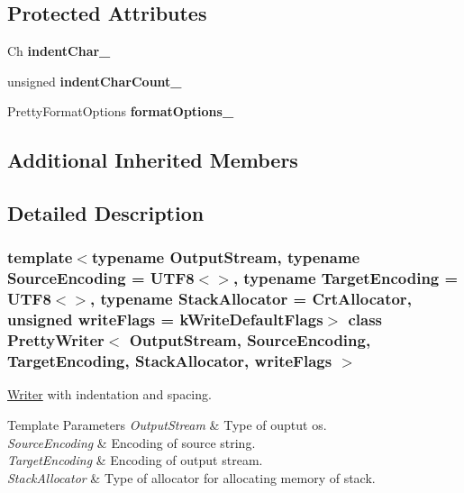 \subsection*{Protected Attributes}
\begin{DoxyCompactItemize}
\item 
\mbox{\label{a02228_aaa3f6380daa8466a5101ed18fc33bf04}} 
Ch {\bfseries indent\+Char\+\_\+}
\item 
\mbox{\label{a02228_a7d00b9716ef3cd7e34ae1b744c968f13}} 
unsigned {\bfseries indent\+Char\+Count\+\_\+}
\item 
\mbox{\label{a02228_a15505ed4ea0fa85d339b3a987f1a3aaf}} 
Pretty\+Format\+Options {\bfseries format\+Options\+\_\+}
\end{DoxyCompactItemize}
\subsection*{Additional Inherited Members}


\subsection{Detailed Description}
\subsubsection*{template$<$typename Output\+Stream, typename Source\+Encoding = U\+T\+F8$<$$>$, typename Target\+Encoding = U\+T\+F8$<$$>$, typename Stack\+Allocator = Crt\+Allocator, unsigned write\+Flags = k\+Write\+Default\+Flags$>$\newline
class Pretty\+Writer$<$ Output\+Stream, Source\+Encoding, Target\+Encoding, Stack\+Allocator, write\+Flags $>$}

\hyperlink{a02224}{Writer} with indentation and spacing. 


\begin{DoxyTemplParams}{Template Parameters}
{\em Output\+Stream} & Type of ouptut os. \\
\hline
{\em Source\+Encoding} & Encoding of source string. \\
\hline
{\em Target\+Encoding} & Encoding of output stream. \\
\hline
{\em Stack\+Allocator} & Type of allocator for allocating memory of stack. \\
\hline
\end{DoxyTemplParams}


